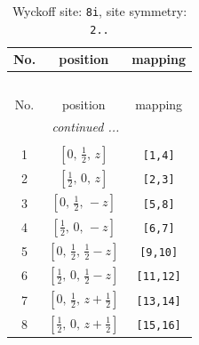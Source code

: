 \documentclass[fleqn,8pt]{jsarticle}
\begin{document}
\renewcommand{\arraystretch}{1.2}
\begin{longtable}{ccc}
\caption{Wyckoff site: {\tt 8i}, site symmetry: {\tt 2..}}
 \\
 \hline \hline
No. & position & mapping \\ \hline \endfirsthead

\multicolumn{2}{l}{\tablename\ \thetable{}} \\
 \hline \hline
No. & position & mapping \\ \hline \endhead

 \hline \hline
\multicolumn{2}{r}{\footnotesize\it continued ...} \\ \endfoot

 \hline \hline
\multicolumn{2}{r}{} \\ \endlastfoot

1 & $\left[ 0,\, \frac{1}{2},\, z \right]$ & {\tt [1,4]} \\ \hline
2 & $\left[ \frac{1}{2},\, 0,\, z \right]$ & {\tt [2,3]} \\ \hline
3 & $\left[ 0,\, \frac{1}{2},\, - z \right]$ & {\tt [5,8]} \\ \hline
4 & $\left[ \frac{1}{2},\, 0,\, - z \right]$ & {\tt [6,7]} \\ \hline
5 & $\left[ 0,\, \frac{1}{2},\, \frac{1}{2} - z \right]$ & {\tt [9,10]} \\ \hline
6 & $\left[ \frac{1}{2},\, 0,\, \frac{1}{2} - z \right]$ & {\tt [11,12]} \\ \hline
7 & $\left[ 0,\, \frac{1}{2},\, z + \frac{1}{2} \right]$ & {\tt [13,14]} \\ \hline
8 & $\left[ \frac{1}{2},\, 0,\, z + \frac{1}{2} \right]$ & {\tt [15,16]} \\
\end{longtable}
\renewcommand{\arraystretch}{1.2}
\end{document}
